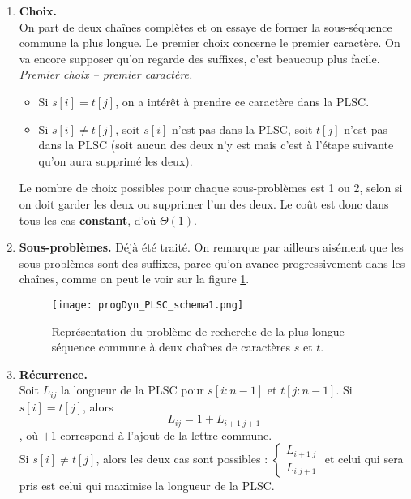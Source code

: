 \documentclass[12pt,a4paper]{book}
\begin{document}
\begin{enumerate}
\item \textbf{Choix.} \\
On part de deux chaînes complètes et on essaye de former la sous-séquence commune la plus longue. Le premier choix concerne le premier caractère. On va encore supposer qu'on regarde des suffixes, c'est beaucoup plus facile. \\

\leftbar
\textit{Premier choix -- premier caractère.} 
\begin{itemize}[label = $\star$]
\item Si $s[i]=t[j]$, on a intérêt à prendre ce caractère dans la PLSC. 
\item Si $s[i]\neq t[j]$, soit $s[i]$ n'est pas dans la PLSC, soit $t[j]$ n'est pas dans la PLSC (soit aucun des deux n'y est mais c'est à l'étape suivante qu'on aura supprimé les deux).
\end{itemize}
\endleftbar
Le nombre de choix possibles pour chaque sous-problèmes est 1 ou 2, selon si on doit garder les deux ou supprimer l'un des deux. Le coût est donc dans tous les cas \textbf{constant}, d'où $\Theta(1)$. \\

\item \textbf{Sous-problèmes.} Déjà été traité. On remarque par ailleurs aisément que les sous-problèmes sont des suffixes, parce qu'on avance progressivement dans les chaînes, comme on peut le voir sur la figure \ref{fig:progDyn_PLSC_schema1}.
\begin{figure}[h]
\centering
\texttt{[image: progDyn\_PLSC\_schema1.png]}
\caption{Représentation du problème de recherche de la plus longue séquence commune à deux chaînes de caractères $s$ et $t$.}
\label{fig:progDyn_PLSC_schema1}
\end{figure}
\item \textbf{Récurrence.} \\
Soit $L_{ij}$ la longueur de la PLSC pour $s[i:n-1]$ et $t[j:n-1]$. Si $s[i]=t[j]$, alors
$$L_{ij} = 1+ L_{i+1 \; j+1}$$, où $+1$ correspond à l'ajout de la lettre commune. \\

Si $s[i] \neq t[j]$, alors les deux cas sont possibles : $\left\{\begin{array}{l}
L_{i+1 \; j} \\ L_{i \; j+1}
\end{array} \right.$ et celui qui sera pris est celui qui maximise la longueur de la PLSC. \\


\end{enumerate}
\end{document}
